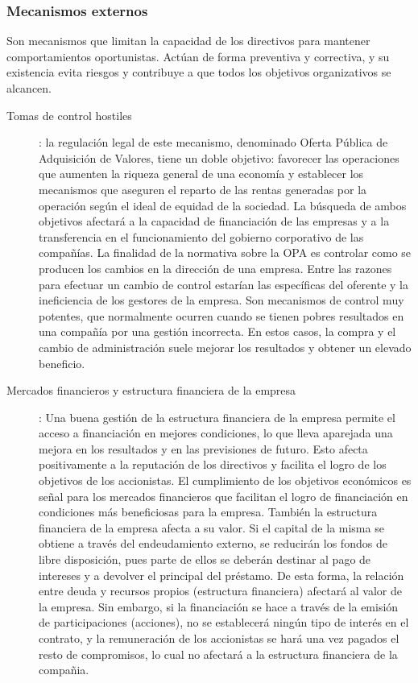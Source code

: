 \documentclass[12pt,a4paper,spanish]{report}
\begin{document}
				\subsubsection{\textcolor[rgb]{0.9,0.3,0.3}Mecanismos externos}
					Son mecanismos que limitan la capacidad de los directivos para mantener comportamientos oportunistas. Actúan de forma preventiva y correctiva, y su existencia evita riesgos y contribuye a que todos los objetivos organizativos se alcancen.
					\begin{description}
						\item[Tomas de control hostiles]: la regulación legal de este mecanismo, denominado Oferta Pública de  Adquisición de Valores, tiene un doble objetivo: favorecer las operaciones que aumenten la riqueza general de una economía y establecer los mecanismos que aseguren el reparto de las rentas generadas por la operación según el ideal de equidad de la sociedad. La búsqueda de ambos objetivos afectará a la capacidad de financiación de las empresas y a la transferencia en el funcionamiento del gobierno corporativo de las compañías. La finalidad de la normativa sobre la OPA es controlar como se producen los cambios en la dirección de una empresa. Entre las razones para efectuar un cambio de control estarían las específicas del oferente y la ineficiencia de los gestores de la empresa. Son mecanismos de control muy potentes, que normalmente ocurren cuando se tienen pobres resultados en una compañía por una gestión incorrecta. En estos casos, la compra y el cambio de administración suele mejorar los resultados y obtener un elevado beneficio.

						\item[Mercados financieros y estructura financiera de la empresa]: Una buena gestión de la estructura financiera de la empresa permite el acceso a financiación en mejores condiciones, lo que lleva aparejada una mejora en los resultados y en las previsiones de futuro. Esto afecta positivamente a la reputación de los directivos y facilita el logro de los objetivos de los accionistas. El cumplimiento de los objetivos económicos es señal para los mercados financieros que facilitan el logro de financiación en condiciones más beneficiosas para la empresa. También la estructura financiera de la empresa afecta a su valor. Si el capital de la misma se obtiene a través del endeudamiento  externo, se reducirán los fondos de libre disposición, pues parte de ellos se deberán destinar al pago de intereses y a devolver el principal del préstamo. De esta forma, la relación entre deuda y recursos propios (estructura financiera) afectará al valor de la empresa. Sin embargo, si la financiación se hace a través de la emisión de participaciones (acciones), no se establecerá ningún tipo de interés en el contrato, y la remuneración de los accionistas se hará una vez pagados el resto de compromisos, lo cual no afectará a la estructura financiera de la compañia.


\end{description}
\end{document}
